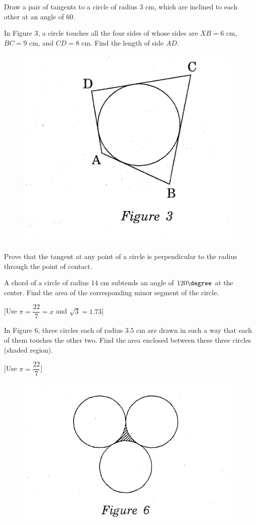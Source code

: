     \item Draw a pair of tangents to a circle of radius $3$ cm, which are inclined to each other at an angle of 60\degree.


    \item In Figure $3$, a circle touches all the four sides of whose sides are $XB = 6$ cm, $BC = 9$ cm, and $CD = 8$ cm. Find the length of side $AD$.
 \begin{figure}[H]
    \centering
    \includegraphics[width=0.8\columnwidth]{figs/figure3.jpg.png}
 \end{figure}
 
 \item Prove that the tangent at any point of a circle is perpendicular to the radius through the point of contact.
 
  

  \item A chord of a circle of radius $14$ cm subtends an angle of $120\degree $ at the center. Find the area of the corresponding minor segment of the circle. 

[Use $\pi = \dfrac{22}{7} = x$ and $\sqrt{3} = 1.73$]
\item In Figure $6$, three circles each of radius $3.5$ cm are drawn in such a way that each of them touches the other two. Find the area enclosed between these three circles (shaded region).

[Use $\pi = \dfrac{22}{7}$]
 \begin{figure}[H]
    \centering
    \includegraphics[width=0.8\columnwidth]{figs/figure6.jpg.png}
 \end{figure}


